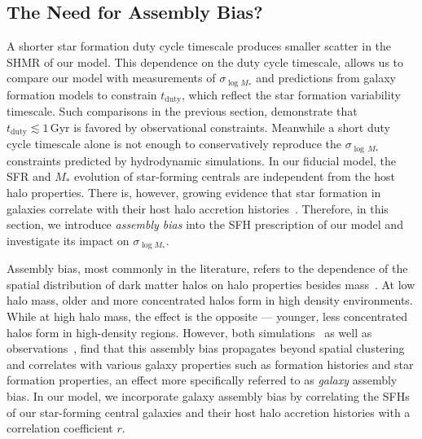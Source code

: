 \documentclass[12pt, letterpaper, preprint, tighten]{aastex62}
\newcommand{\ch}[1]{\color{orange}{\bf CH:} #1}
\begin{document}
\subsection{The Need for Assembly Bias?}
A shorter star formation duty cycle timescale produces smaller scatter in the 
SHMR of our model. This dependence on the duty cycle timescale, allows us to 
compare our model with measurements of $\sigma_{\log M_*}$ and predictions 
from galaxy formation models to constrain $t_\mathrm{duty}$, which reflect 
the star formation variability timescale. Such comparisons in the previous 
section, demonstrate that $t_\mathrm{duty} \lesssim 1\,\mathrm{Gyr}$ is 
favored by observational constraints. Meanwhile a short duty cycle 
timescale alone is not enough to conservatively reproduce the $\sigma_{\log\,M_*}$ 
constraints predicted by hydrodynamic simulations. In our fiducial model, 
the SFR and $M_*$ evolution of star-forming centrals are independent from the
host halo properties. There is, however, growing evidence that star formation in  
galaxies correlate with their host halo accretion histories~\citep[\emph{e.g.}][]{lim2016, tojeiro2017, tinker2018b}. 
Therefore, in this section, we introduce \emph{assembly bias} into the SFH 
prescription of our model and investigate its impact on $\sigma_{\log M_*}$.

Assembly bias, most commonly in the literature, refers to the dependence of the 
spatial distribution of dark matter halos on halo properties besides 
mass~\citep{gao2005,wechsler2006,gao2007,wetzel2007,li2008,sunayama2016}.
At low halo mass, older and more concentrated halos form in high density environments. 
While at high halo mass, the effect is the opposite --- younger, less concentrated 
halos form in high-density regions. However, both 
simulations~\citep[\emph{e.g.}][]{croton2007, artale2018, zehavi2018} as well as  
observations~\citep{yang2006,wang2008,tinker2011,wang2013,lacerna2014,tinker2018},
find that this assembly bias propagates beyond spatial clustering and correlates
with various galaxy properties such as formation histories and star formation 
properties, an effect more specifically referred to as {\em galaxy} assembly bias. 
In our model, we incorporate galaxy assembly bias by correlating the SFHs 
of our star-forming central galaxies and their host halo accretion histories 
with a correlation coefficient $r$. 
\end{document}
